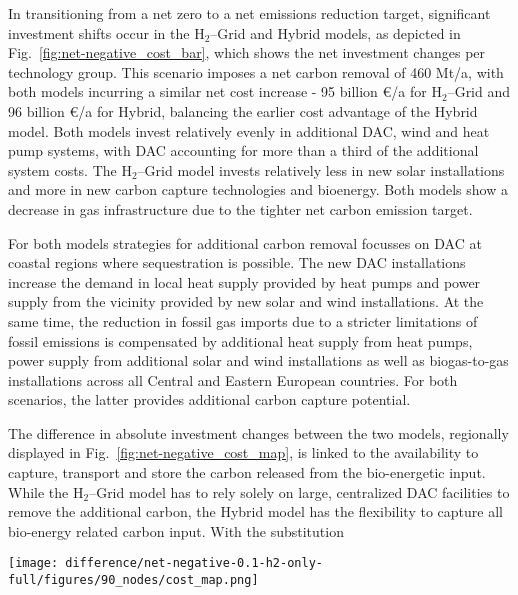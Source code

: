 \documentclass[twocolumn]{article}
\newcommand{\hydrogen}{H$_2$}
\newcommand{\hydrogengrid}{\hydrogen{}--Grid}
\begin{document}
In transitioning from a net zero to a net emissions reduction target, significant investment shifts occur in the \hydrogengrid{} and Hybrid models, as depicted in Fig.~\ref{fig:net-negative_cost_bar}, which shows the net investment changes per technology group. This scenario imposes a net carbon removal of 460 Mt/a, with both models incurring a similar net cost increase - 95 billion €/a for \hydrogengrid{} and 96 billion €/a for Hybrid, balancing the earlier cost advantage of the Hybrid model. Both models invest relatively evenly in additional DAC, wind and heat pump systems, with DAC accounting for more than a third of the additional system costs.  The \hydrogengrid{} model invests relatively less in new solar installations and more in new carbon capture technologies and bioenergy. Both models show a decrease in gas infrastructure due to the tighter net carbon emission target.

For both models strategies for additional carbon removal focusses on DAC at coastal regions where sequestration is possible. The new DAC installations increase the demand in local heat supply provided by heat pumps and power supply from the vicinity provided by new solar and wind installations.
At the same time, the reduction in fossil gas imports due to a stricter limitations of fossil emissions is compensated by additional heat supply from heat pumps, power supply from additional solar and wind installations as well as biogas-to-gas installations across all Central and Eastern European countries. For both scenarios, the latter provides additional carbon capture potential.

The difference in absolute investment changes between the two models, regionally displayed in Fig.~\ref{fig:net-negative_cost_map}, is linked to the availability to capture, transport and store the carbon released from the bio-energetic input. While the \hydrogengrid{} model has to rely solely on large, centralized DAC facilities to remove the additional carbon, the Hybrid model has the flexibility to capture all bio-energy related carbon input. With the substitution


\begin{figure*}[htb!]
    \centering
    \texttt{[image: difference/net-negative-0.1-h2-only-full/figures/90\_nodes/cost\_map.png]}
    \caption[short]{Net difference in investments between the \hydrogengrid{} model and the Hybrid model for the Net-Negative scenario.}
    \label{fig:net-negative_cost_map}
\end{figure*}
\end{document}
